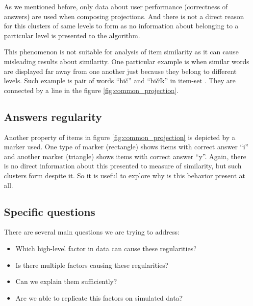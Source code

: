 \documentclass[
  digital, %
  table,   %
  nolof,     %
  nolot,     %
  nocover,
  color,
  final, %
]{fithesis3}
\begin{document}
As we mentioned before, only data about user performance (correctness of answers) are used when composing projections. And there is not a direct reason for this clusters of same levels to form as no information about belonging to a particular level is presented to the algorithm.


This phenomenon is not suitable for analysis of item similarity as it can cause misleading results about similarity. One particular example is when similar words are displayed far away from one another just because they belong to different levels. Such example is pair of words ``bič'' and ``bičík'' in item-set \cvicenieB{}. They are connected by a line in the figure \ref{fig:common_projection}.


\subsection{Answers regularity}\label{answers-regularity}

Another property of items in figure \ref{fig:common_projection} is depicted by a marker used. One type of marker (rectangle) shows items with correct answer ``i'' and another marker (triangle) shows items with correct answer ``y''. Again, there is no direct information about this presented to measure of similarity, but such clusters form despite it. So it is useful to explore why is this behavior present at all.


\subsection{Specific questions}\label{specific-questions}

There are several main questions we are trying to address:

\begin{itemize}
 \item Which high-level factor in data can cause these regularities?
 \item Is there multiple factors causing these regularities?
 \item Can we explain them sufficiently?
 \item Are we able to replicate this factors on simulated data?
\end{itemize}
\end{document}
